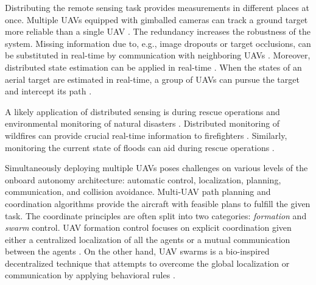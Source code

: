 \documentclass[a4paper,11pt,twoside,openright]{book}
\begin{document}
Distributing the remote sensing task provides measurements in different places at once.
Multiple UAVs equipped with gimballed cameras can track a ground target more reliable than a single \ac{UAV} \cite{sun2014distributed}.
The redundancy increases the robustness of the system.
Missing information due to, e.g., image dropouts or target occlusions, can be substituted in real-time by communication with neighboring \acp{UAV} \cite{baek2020optimal, farmani2015tracking}.
Moreover, distributed state estimation can be applied in real-time \cite{capitan2009delayed, merino2007multi, wan2000unscented}.
When the states of an aerial target are estimated in real-time, a group of \acp{UAV} can pursue the target and intercept its path \cite{zhu2017distributed}.

A likely application of distributed sensing is during rescue operations and environmental monitoring of natural disasters \cite{manfreda2018use}.
Distributed monitoring of wildfires can provide crucial real-time information to firefighters \cite{yuan2015survey, pham2020distributed}.
Similarly, monitoring the current state of floods can aid during rescue operations \cite{karamuz2020use, perks2016advances}.

Simultaneously deploying multiple \acp{UAV} poses challenges on various levels of the onboard autonomy architecture: automatic control, localization, planning, communication, and collision avoidance.
Multi-\ac{UAV} path planning and coordination algorithms provide the aircraft with feasible plans to fulfill the given task.
The coordinate principles are often split into two categories: \emph{formation} and \emph{swarm} control.
\ac{UAV} formation control focuses on explicit coordination given either a centralized localization of all the agents or a mutual communication between the agents \cite{kamel2017model, kuriki2014avoidance, rezaee2013motion, wang2015efficient}.
On the other hand, \ac{UAV} swarms is a bio-inspired decentralized technique that attempts to overcome the global localization or communication by applying behavioral rules \cite{mcguire2019minimal, burkle2011towards, saulnier2017flocking}.
\end{document}
